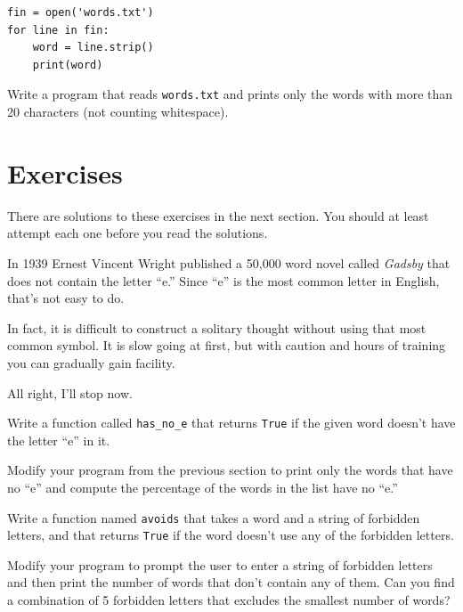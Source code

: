 \documentclass[10pt]{book}
\begin{document}
\beforeverb
\begin{verbatim}
fin = open('words.txt')
for line in fin:
    word = line.strip()
    print(word)
\end{verbatim}
\afterverb
%

\begin{ex}
Write a program that reads {\tt words.txt} and prints only the
words with more than 20 characters (not counting whitespace).


\end{ex}


\section{Exercises}

There are solutions to these exercises in the next section.
You should at least attempt each one before you read the solutions.

\begin{ex}
In 1939 Ernest Vincent Wright published a 50,000 word novel called
{\em Gadsby} that does not contain the letter ``e.''  Since ``e'' is
the most common letter in English, that's not easy to do.

In fact, it is difficult to construct a solitary thought without using
that most common symbol.  It is slow going at first, but with caution
and hours of training you can gradually gain facility.

All right, I'll stop now.

Write a function called \verb"has_no_e" that returns {\tt True} if
the given word doesn't have the letter ``e'' in it.

Modify your program from the previous section to print only the words
that have no ``e'' and compute the percentage of the words in the list
have no ``e.''


\end{ex}


\begin{ex} 
Write a function named {\tt avoids}
that takes a word and a string of forbidden letters, and
that returns {\tt True} if the word doesn't use any of the forbidden
letters.

Modify your program to prompt the user to enter a string
of forbidden letters and then print the number of words that
don't contain any of them.
Can you find a combination of 5 forbidden letters that
excludes the smallest number of words?
\end{ex}
\end{document}
